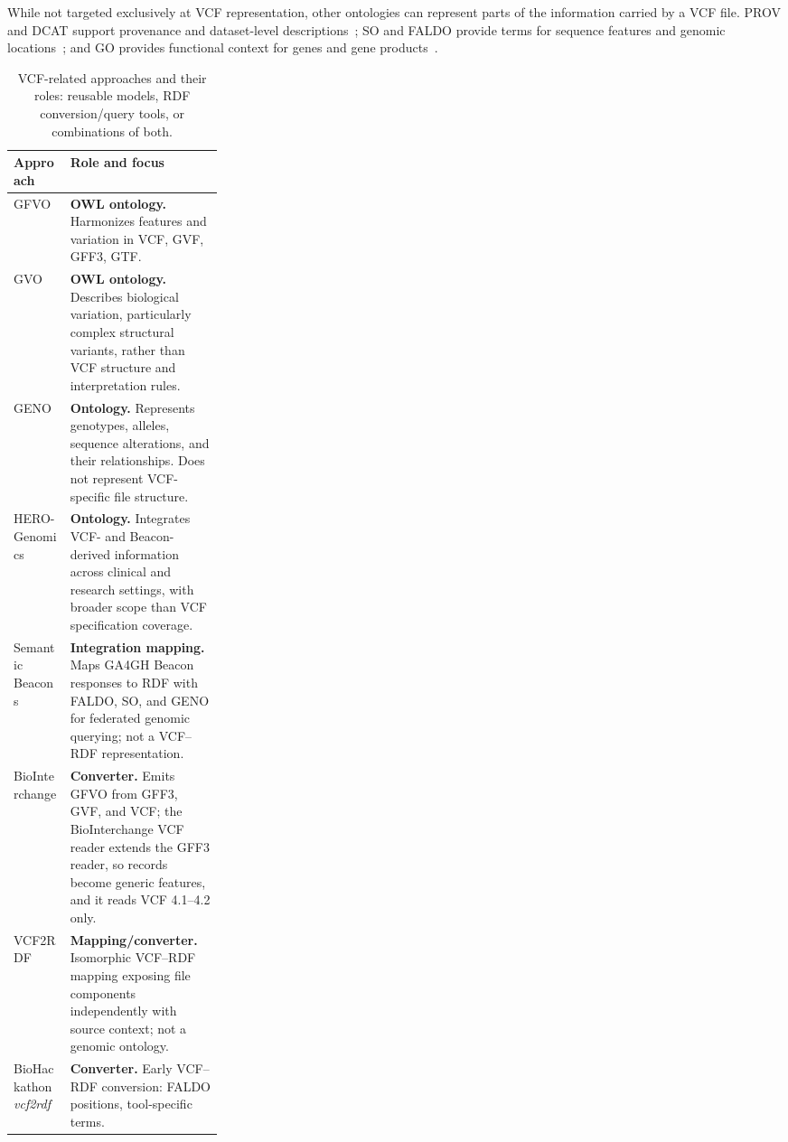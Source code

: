 While not targeted exclusively at VCF representation, other ontologies can represent parts of the information carried by a VCF file. 
PROV and DCAT support provenance and dataset-level descriptions~\cite{moreau2015prov,albertoni2024dcat}; SO and FALDO provide terms for sequence features and genomic locations~\cite{eilbeck2005so,bolleman2016faldo}; and GO provides functional context for genes and gene products~\cite{geneontology2026}.

\begin{table}[htbp]
\caption{VCF-related approaches and their roles: reusable models, RDF conversion/query tools, or combinations of both.}
\label{tab:vcf-rdf-related-work}
\centering
\small
\begin{tabularx}{\linewidth}{@{}>{\raggedright\arraybackslash}p{0.27\linewidth}>{\raggedright\arraybackslash}X@{}}
\toprule
Approach & Role and focus \\
\midrule
GFVO~\cite{baran2015gfvo}
& \textbf{OWL ontology.} Harmonizes features and variation in VCF, GVF, GFF3, GTF.
\\
GVO~\cite{kawashima2023gvo}
& \textbf{OWL ontology.} Describes biological variation, particularly complex structural variants, rather than VCF structure and interpretation rules.
\\
GENO~\cite{shefchek2020monarch}
& \textbf{Ontology.} Represents genotypes, alleles, sequence alterations, and their relationships. Does not represent VCF-specific file structure.
\\
HERO-Genomics~\cite{cazzaro2025hero}
& \textbf{Ontology.} Integrates VCF- and Beacon-derived information across clinical and research settings, with broader scope than VCF specification coverage.
\\
Semantic Beacons~\cite{bodrug2025semantic}
& \textbf{Integration mapping.} Maps GA4GH Beacon responses to RDF with FALDO, SO, and GENO for federated genomic querying; not a VCF--RDF representation.
\\
BioInterchange~\cite{baran2015gfvo}
& \textbf{Converter.} Emits GFVO from GFF3, GVF, and VCF; the BioInterchange VCF reader extends the GFF3 reader, so records become generic features, and it reads VCF 4.1--4.2 only.
\\
VCF2RDF~\cite{penha2017vcf2rdf}
& \textbf{Mapping/converter.} Isomorphic VCF--RDF mapping exposing file components independently with source context; not a genomic ontology.
\\
BioHackathon \textit{vcf2rdf}~\cite{katayama2019biohackathon}
& \textbf{Converter.} Early VCF--RDF conversion: FALDO positions, tool-specific terms.

\end{tabularx}
\end{table}
